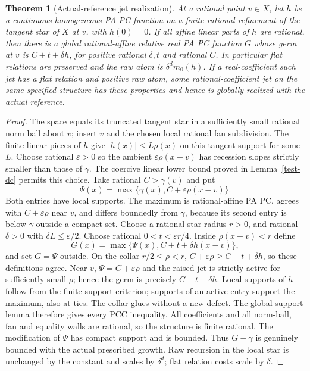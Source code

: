 \documentclass[11pt]{article}
\newtheorem{theorem}{Theorem}
\begin{document}
\begin{theorem}[Actual-reference jet realization]\label{jet-realization}
At a rational point $v\in X$, let $h$ be a continuous homogeneous PA PC
function on a finite rational refinement of the tangent star of $X$ at
$v$, with $h(0)=0$. If all affine linear parts of $h$ are rational,
then there is a global rational-affine relative real PA PC function
$G$ whose germ at $v$ is $C+t+\delta h$, for positive rational
$\delta,t$ and rational $C$. In particular flat relations are preserved
and the raw atom is $\delta^d m_0(h)$.
If a real-coefficient such jet has a flat relation and positive raw
atom, some rational-coefficient jet on the same specified structure
has these properties and hence is globally realized with the actual
reference.
\end{theorem}
\begin{proof}
The space equals its truncated tangent star in a sufficiently small
rational norm ball about $v$; insert $v$ and the chosen local rational
fan subdivision. The finite linear pieces of $h$ give
$|h(x)|\leq L\rho(x)$ on this tangent support for some $L$.
Choose rational $\varepsilon>0$ so the ambient $\varepsilon\rho(x-v)$
has recession slopes strictly smaller than those of $\gamma$.
The coercive linear lower bound proved in Lemma~\ref{test-dc} permits
this choice. Take rational $C>\gamma(v)$ and put
\[
 \Psi(x)=\max\{\gamma(x),C+\varepsilon\rho(x-v)\}.
\]
Both entries have local supports. The maximum is rational-affine PA
PC, agrees with $C+\varepsilon\rho$ near $v$, and differs boundedly
from $\gamma$, because its second entry is below $\gamma$ outside a
compact set. Choose a rational star radius $r>0$, and rational
$\delta>0$ with $\delta L\leq\varepsilon/2$. Choose rational
$0<t<\varepsilon r/4$. Inside $\rho(x-v)<r$ define
\[
 G(x)=\max\{\Psi(x),C+t+\delta h(x-v)\},
\]
and set $G=\Psi$ outside. On the collar $r/2\leq\rho<r$,
$C+\varepsilon\rho\geq C+t+\delta h$, so these definitions agree.
Near $v$, $\Psi=C+\varepsilon\rho$ and the raised jet is strictly
active for sufficiently small $\rho$; hence the germ is precisely
$C+t+\delta h$. Local supports of $h$ follow from the finite support
criterion; supports of an active entry support the maximum, also at
ties. The collar glues without a new defect. The global support lemma
therefore gives every PCC inequality. All coefficients and all norm-ball,
fan and equality walls are rational, so the structure is finite rational.
The modification of $\Psi$ has compact support and is bounded. Thus
$G-\gamma$ is genuinely bounded with the actual prescribed growth.
Raw recursion in the local star is unchanged by the constant and scales
by $\delta^d$; flat relation costs scale by $\delta$.


\end{proof}
\end{document}

